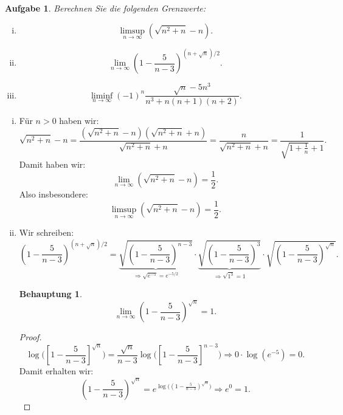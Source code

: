 \documentclass[a4paper, 20]{exam}
\newtheorem{ex}{Aufgabe}
\newtheorem{claim}{Behauptung}
\begin{document}
\begin{ex}
Berechnen Sie die folgenden Grenzwerte:

\begin{enumerate}[i.)]
\item
$$ \limsup_{n \rightarrow \infty} \left(\sqrt{n^2+n}-n\right).$$

\item
$$\lim_{n \rightarrow \infty} \left( 1 - \frac{5}{n-3} \right)^{(n+\sqrt{n})/2}.$$

\item
$$\liminf_{n \rightarrow \infty} (-1)^n \frac{\sqrt{n}-5n^3}{n^3 + n(n+1)(n+2)}.$$

\end{enumerate}
\end{ex}
\begin{solution}
\begin{enumerate}[i.)]
\item
F\"ur $n>0$ haben wir:
$$ \sqrt{n^2 + n} -n = \frac{(\sqrt{n^2 +n} -n)(\sqrt{n^2 +n}+n)}{\sqrt{n^2 +n}+n} 
= \frac{n}{\sqrt{n^2 +n}+n} = \frac{1}{\sqrt{1 +\frac{1}{n}}+1}.$$
Damit haben wir:
$$\lim_{n \rightarrow \infty} \left(\sqrt{n^2+n}-n\right)= \frac{1}{2}.$$
Also insbesondere:
$$\limsup_{n \rightarrow \infty} \left(\sqrt{n^2+n}-n\right)=\frac{1}{2}.$$
\item
Wir schreiben:
$$ \left( 1 - \frac{5}{n-3} \right)^{(n+\sqrt{n})/2} 
= \underbrace{\sqrt{\left( 1 - \frac{5}{n-3} \right)^{n-3}}}_{\Longrightarrow \sqrt{e^{-5}}=e^{-5/2}} \cdot \underbrace{\sqrt{\left( 1 - \frac{5}{n-3} \right)^{3}}}_{\Longrightarrow \sqrt{1^3}=1} \cdot \sqrt{\left( 1 - \frac{5}{n-3} \right)^{\sqrt{n}}} .$$

\begin{claim}
$$\lim_{n \rightarrow \infty} \left( 1 - \frac{5}{n-3} \right)^{\sqrt{n}}=1.$$
\end{claim}
\begin{proof}
$$ \log\bigg(\left[1- \frac{5}{n-3}\right]^{\sqrt{n}}\bigg) = \frac{\sqrt{n}}{n-3} \log\bigg(\left[1- \frac{5}{n-3}\right]^{n-3}\bigg) \Longrightarrow 0 \cdot \log(e^{-5})=0.$$
Damit erhalten wir:
$$ \left( 1 - \frac{5}{n-3} \right)^{\sqrt{n}} = e^{\log\big((1- \frac{5}{n-3})^{\sqrt{n}}\big)} 
\Longrightarrow e^0=1. $$
\end{proof}



\end{enumerate}
\end{solution}
\end{document}
